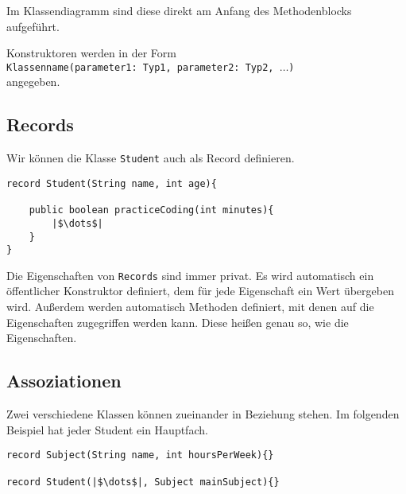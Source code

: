 \documentclass[a4paper]{scrartcl}
\begin{document}
Im Klassendiagramm sind diese direkt am Anfang des Methodenblocks aufgeführt.

\begin{center}
\end{center}

Konstruktoren werden in der Form \\ \texttt{Klassenname(parameter1: Typ1, parameter2: Typ2, $\dots$)}\\ angegeben.


\subsection*{Records}

Wir können die Klasse \texttt{Student} auch als Record definieren.
\begin{verbatim}
record Student(String name, int age){
	   
    public boolean practiceCoding(int minutes){
	    |$\dots$|
    }
}
\end{verbatim}

Die Eigenschaften von \texttt{Records} sind immer privat. Es wird automatisch ein öffentlicher Konstruktor definiert, dem für jede Eigenschaft ein Wert übergeben wird.
Außerdem werden automatisch Methoden definiert, mit denen auf die Eigenschaften zugegriffen werden kann. Diese heißen genau so, wie die Eigenschaften.
\begin{center}
\end{center}

\subsection*{Assoziationen}
Zwei verschiedene Klassen können zueinander in Beziehung stehen.
Im folgenden Beispiel hat jeder Student ein Hauptfach.
\begin{verbatim}
record Subject(String name, int hoursPerWeek){}

record Student(|$\dots$|, Subject mainSubject){}
\end{verbatim}
\end{document}
